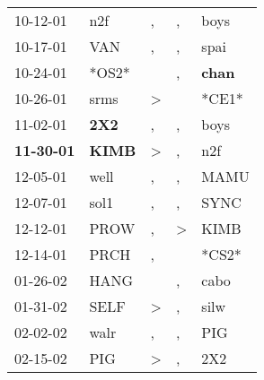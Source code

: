 \begin{supertabular}{p{0.07\textwidth}p{0.06\textwidth}p{0.02\textwidth}p{0.02\textwidth}p{0.06\textwidth}}
          10-12-01\textsuperscript{} &            n2f\textsuperscript{} &                , &                , &           boys\textsuperscript{} \\
          10-17-01\textsuperscript{} &            VAN\textsuperscript{} &                , &                , &           spai\textsuperscript{} \\
          10-24-01\textsuperscript{} &                            *OS2* &                  &                , &  \textbf{chan\textsuperscript{}} \\
          10-26-01\textsuperscript{} &           srms\textsuperscript{} &     \textgreater &                  &                            *CE1* \\
          11-02-01\textsuperscript{} &   \textbf{2X2\textsuperscript{}} &                , &                , &           boys\textsuperscript{} \\
 \textbf{11-30-01\textsuperscript{}} &  \textbf{KIMB\textsuperscript{}} &     \textgreater &                , &            n2f\textsuperscript{} \\
          12-05-01\textsuperscript{} &           well\textsuperscript{} &                , &                , &           MAMU\textsuperscript{} \\
          12-07-01\textsuperscript{} &           sol1\textsuperscript{} &                , &                , &           SYNC\textsuperscript{} \\
          12-12-01\textsuperscript{} &           PROW\textsuperscript{} &                , &     \textgreater &           KIMB\textsuperscript{} \\
          12-14-01\textsuperscript{} &           PRCH\textsuperscript{} &                , &                  &                            *CS2* \\
          01-26-02\textsuperscript{} &           HANG\textsuperscript{} &                  &                , &           cabo\textsuperscript{} \\
          01-31-02\textsuperscript{} &           SELF\textsuperscript{} &     \textgreater &                , &           silw\textsuperscript{} \\
          02-02-02\textsuperscript{} &           walr\textsuperscript{} &                , &                , &            PIG\textsuperscript{} \\
          02-15-02\textsuperscript{} &            PIG\textsuperscript{} &     \textgreater &                , &            2X2\textsuperscript{} \\

\end{supertabular}
